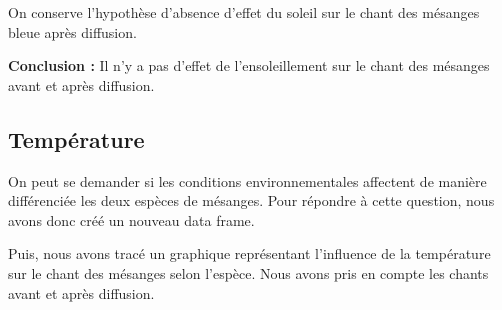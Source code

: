 \documentclass[
  french,
]{article}
\newenvironment{Shaded}{\begin{snugshade}}{\end{snugshade}}
\newcommand{\AttributeTok}[1]{\textcolor[rgb]{0.13,0.29,0.53}{#1}}
\newcommand{\FunctionTok}[1]{\textcolor[rgb]{0.13,0.29,0.53}{\textbf{#1}}}
\newcommand{\NormalTok}[1]{#1}
\newcommand{\OtherTok}[1]{\textcolor[rgb]{0.56,0.35,0.01}{#1}}
\newcommand{\SpecialCharTok}[1]{\textcolor[rgb]{0.81,0.36,0.00}{\textbf{#1}}}
\begin{document}
On conserve l'hypothèse d'absence d'effet du soleil sur le chant des
mésanges bleue après diffusion.

\textbf{Conclusion :} Il n'y a pas d'effet de l'ensoleillement sur le
chant des mésanges avant et après diffusion.

\subsection{Température}\label{tempuxe9rature}

On peut se demander si les conditions environnementales affectent de
manière différenciée les deux espèces de mésanges. Pour répondre à cette
question, nous avons donc créé un nouveau data frame.

\begin{Shaded}
\end{Shaded}

Puis, nous avons tracé un graphique représentant l'influence de la
température sur le chant des mésanges selon l'espèce. Nous avons pris en
compte les chants avant et après diffusion.
\end{document}
